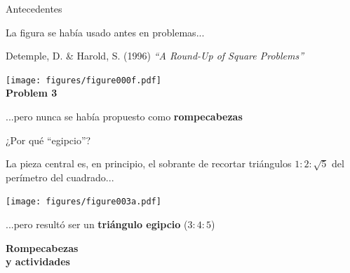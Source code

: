 \documentclass[14pt,aspectratio=169,usenames,dvipsnames]{beamer}
\begin{document}

    \begin{frame}{Antecedentes}
        \begin{center}
            La figura se había usado antes en problemas...

            \bigskip\medskip

            {\footnotesize Detemple, D. \& Harold, S. (1996) \emph{``A Round-Up of Square Problems''}}\\

            \bigskip

            \texttt{[image: figures/figure000f.pdf]}\\[-1ex]{\footnotesize \textbf{Problem 3}}

            \bigskip

            ...pero nunca se había propuesto como \textbf{rompecabezas}
        \end{center}
    \end{frame}


    \begin{frame}{¿Por qué ``egipcio''?}
        \begin{center}
            La pieza central es, en principio, el sobrante de recortar triángulos $1\!\!:\!\!2\!\!:\!\!\sqrt{5}$ del perímetro del cuadrado...

            \bigskip \bigskip

            \texttt{[image: figures/figure003a.pdf]} \\

            \bigskip \bigskip

            ...pero resultó ser un \textbf{triángulo egipcio} ($3\!\!:\!\!4\!\!:\!\!5$)
        \end{center}
    \end{frame}


    \begin{frame}{}
        \begin{center}
            \textbf{\Huge Rompecabezas\\y actividades}\\
        \end{center}
    \end{frame}
\end{document}
